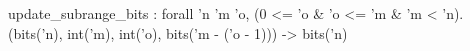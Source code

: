 update_subrange_bits : forall 'n 'm 'o, (0 <= 'o & 'o <= 'm & 'm < 'n).
  (bits('n), int('m), int('o), bits('m - ('o - 1))) -> bits('n)